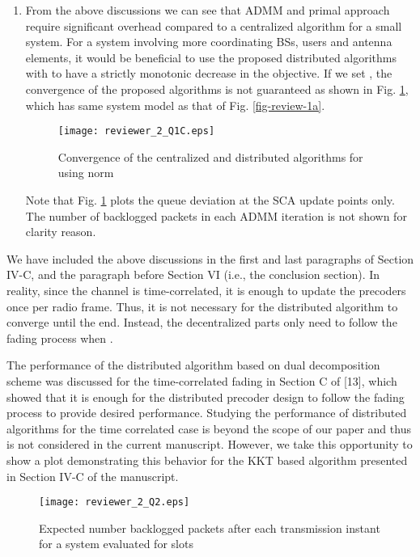 \begin{enumerate}
\begin{enumerate}
		\item From the above discussions we can see that \ac{ADMM} and primal approach require significant overhead compared to a centralized algorithm for a small system. For a system involving more coordinating \acp{BS}, users and antenna elements, it would be beneficial to use the proposed distributed algorithms with  to have a strictly monotonic decrease in the objective. If we set , the convergence of the proposed algorithms is not guaranteed as shown in Fig. \ref{fig-review-2-a}, which has same system model as that of Fig. \ref{fig-review-1a}.
		\begin{figure}[h!]
			\centering
			\texttt{[image: reviewer\_2\_Q1C.eps]}
			\caption{Convergence of the centralized and distributed algorithms for  using  norm}
			\label{fig-review-2-a}
		\end{figure}
		Note that Fig. \ref{fig-review-2-a} plots the queue deviation at the \ac{SCA} update points only. The number of backlogged packets in each \ac{ADMM} iteration is not shown for clarity reason.		
		
	\end{enumerate}
	
	We have included the above discussions in the first and last paragraphs of Section IV-C, and the paragraph before Section VI (i.e., the conclusion section). In reality, since the channel is time-correlated, it is enough to update the precoders once per radio frame. Thus, it is not necessary for the distributed algorithm to converge until the end. Instead, the decentralized parts only need to follow the fading process when . 
	
	The performance of the distributed algorithm based on dual decomposition scheme was discussed for the time-correlated fading in Section C of [13], which showed that it is enough for the distributed precoder design to follow the fading process to provide desired performance. Studying the performance of distributed algorithms for the time correlated case is beyond the scope of our paper and thus is not considered in the current manuscript. However, we take this opportunity to show a plot demonstrating this behavior for the \ac{KKT} based algorithm presented in Section IV-C of the manuscript.
	\begin{figure}[h!]
		\centering
		\texttt{[image: reviewer\_2\_Q2.eps]}
		\caption{Expected number backlogged packets after each transmission instant for a system  evaluated for  slots}
		\label{fig-review-2}
	\end{figure}
		

\end{enumerate}
